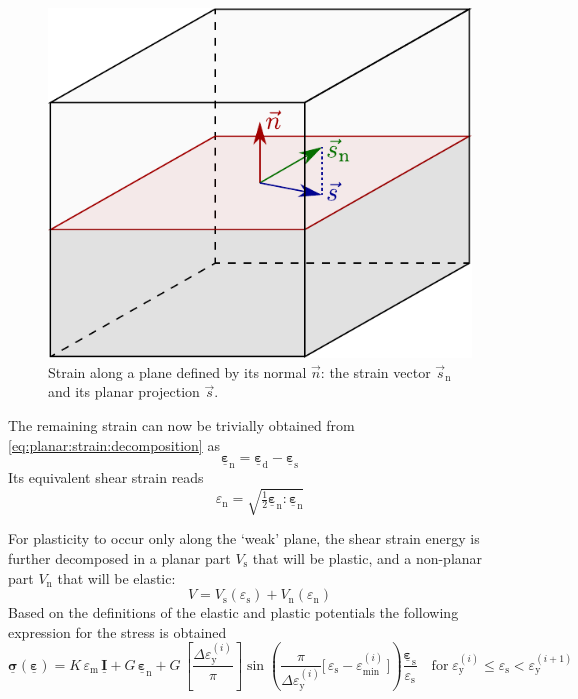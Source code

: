\documentclass[fleqn, colorlinks]{goose-article}
\newcommand\T[1]{\underline{\bm{{#1}}}}
\begin{document}
\begin{figure}[htp]
    \centering
    \includegraphics[width=.35\textwidth]{figures/strain-vector-planar}
    \caption{
        Strain along a plane defined by its normal $\vec{n}$:
        the strain vector $\vec{s}_\mathrm{n}$ and its planar projection $\vec{s}$.}
    \label{fig:strain-vector-planar}
\end{figure}

The remaining strain can now be trivially obtained from \cref{eq:planar:strain:decomposition} as
\begin{equation}
    \T{\varepsilon}_\mathrm{n} = \T{\varepsilon}_\mathrm{d} - \T{\varepsilon}_\mathrm{s}
\end{equation}
Its equivalent shear strain reads
\begin{equation}
    \varepsilon_\mathrm{n}
    = \sqrt{\tfrac{1}{2} \T{\varepsilon}_\mathrm{n} : \T{\varepsilon}_\mathrm{n}}
\end{equation}

For plasticity to occur only along the `weak' plane, the shear strain energy is further
decomposed in a planar part $V_\mathrm{s}$ that will be plastic,
and a non-planar part $V_\mathrm{n}$ that will be elastic:
\begin{equation}
    V
    =
    V_\mathrm{s} ( \varepsilon_\mathrm{s} )
    +
    V_\mathrm{n} ( \varepsilon_\mathrm{n} )
\end{equation}
Based on the definitions of the elastic and plastic potentials the
following expression for the stress is obtained
\begin{equation}
    \T{\sigma} ( \T{\varepsilon} )
    =
    K \, \varepsilon_\mathrm{m} \, \T{I}
    +
    G \, \T{\varepsilon}_\mathrm{n}
    +
    G \,
    \left[ \frac{\Delta \varepsilon_\mathrm{y}^{(i)}}{\pi} \right]
    \sin \left(
        \frac{ \pi }{ \Delta \varepsilon_\mathrm{y}^{(i)} }
        \Big[\, \varepsilon_\mathrm{s} - \varepsilon_\mathrm{min}^{(i)} \,\Big]
    \right)
    \frac{\T{\varepsilon}_\mathrm{s}}{\varepsilon_\mathrm{s}}
    \quad
    \mathrm{for}
    \;
    \varepsilon_\mathrm{y}^{(i)} \leq \varepsilon_\mathrm{s} < \varepsilon_\mathrm{y}^{(i+1)}
\end{equation}
\end{document}
